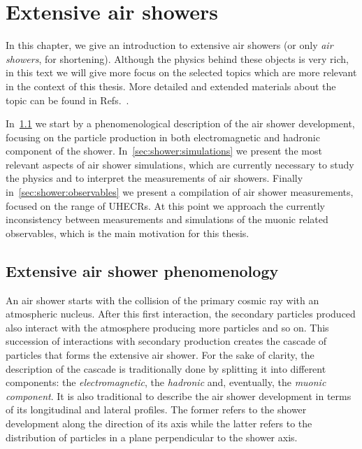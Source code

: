 \chapter[Extensive air showers]{Extensive air showers}
\label{sec:showers}

In this chapter, we give an introduction to extensive air showers
(or only \emph{air showers}, for shortening).
Although the physics behind these objects is very rich,
in this text we will give more focus on the selected topics
which are more relevant in the context of this thesis.
More detailed and extended materials about the topic can be found
in Refs.~\cite{GaisserBook,GriederBook}.

In~\cref{sec:showers:phen} we start by a phenomenological description
of the air shower development, focusing on the particle production in
both electromagnetic and hadronic component of the shower. 
In~\cref{sec:shower:simulations} we present the most relevant aspects
of air shower simulations, which are currently necessary to study
the physics and to interpret the measurements of air showers.
Finally in~\cref{sec:shower:observables} we present a compilation
of air shower measurements, focused on the range of UHECRs.
At this point we approach the currently inconsistency between measurements and
simulations of the muonic related observables, which is the main motivation
for this thesis.


\section{Extensive air shower phenomenology}
\label{sec:showers:phen}

An air shower starts with the collision of the primary cosmic ray 
with an atmospheric nucleus. After this first interaction, the secondary
particles produced also interact with the atmosphere producing more
particles and so on. This succession of interactions with secondary production
creates the cascade of particles that forms the extensive air shower.
For the sake of clarity, the description of the cascade is traditionally
done by splitting it into different components: the \emph{electromagnetic},
the \emph{hadronic} and, eventually, the \emph{muonic component}. It is also traditional
to describe the air shower development in terms of its longitudinal and lateral profiles.
The former refers to the shower development along the direction of its axis
while the latter refers to the distribution of particles
in a plane perpendicular to the shower axis.


